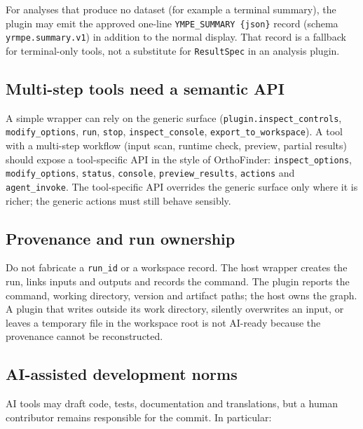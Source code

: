 \documentclass[10pt]{report}
\begin{document}
For analyses that produce no dataset (for example a terminal summary), the
plugin may emit the approved one-line \texttt{YMPE\_SUMMARY \{json\}} record
(schema \texttt{yrmpe.summary.v1}) in addition to the normal display. That
record is a fallback for terminal-only tools, not a substitute for
\texttt{ResultSpec} in an analysis plugin.

\subsection{Multi-step tools need a semantic API}

A simple wrapper can rely on the generic surface
(\texttt{plugin.inspect\_controls}, \texttt{modify\_options}, \texttt{run},
\texttt{stop}, \texttt{inspect\_console}, \texttt{export\_to\_workspace}). A
tool with a multi-step workflow (input scan, runtime check, preview, partial
results) should expose a tool-specific API in the style of OrthoFinder:
\texttt{inspect\_options}, \texttt{modify\_options}, \texttt{status},
\texttt{console}, \texttt{preview\_results}, \texttt{actions} and
\texttt{agent\_invoke}. The tool-specific API overrides the generic surface
only where it is richer; the generic actions must still behave sensibly.

\subsection{Provenance and run ownership}

Do not fabricate a \texttt{run\_id} or a workspace record. The host wrapper
creates the run, links inputs and outputs and records the command. The plugin
reports the command, working directory, version and artifact paths; the host
owns the graph. A plugin that writes outside its work directory, silently
overwrites an input, or leaves a temporary file in the workspace root is not
AI-ready because the provenance cannot be reconstructed.

\subsection{AI-assisted development norms}

AI tools may draft code, tests, documentation and translations, but a human
contributor remains responsible for the commit. In particular:
\end{document}
